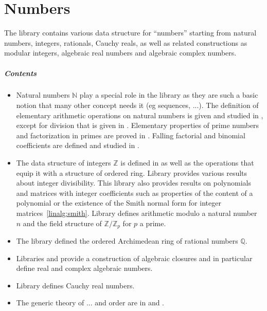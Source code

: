 \chapter{Numbers}

The library contains various data structure for ``numbers''
starting from natural numbers, integers, rationals, Cauchy reals, as well as
related constructions as modular integers, algebraic real numbers and algebraic
complex numbers.

\paragraph{Contents}
\begin{itemize}

\item
Natural numbers $\mathbb{N}$ play a special role in the \mcbMC{} library as they
are such a basic notion that many other concept needs it (eg sequences, ...).
The definition of elementary arithmetic operations on natural numbers
is given and studied in , except for division
that is given in .  Elementary properties of
prime numbers and factorization in primes are proved in
.  Falling factorial and binomial coefficients are defined
and studied in .

\item
The data structure of integers $\mathbb{Z}$ is defined in 
as well as the operations that equip it with a structure of
ordered ring. Library  provides various
results about integer divisibility.  This library also provides
results on polynomials and matrices with integer coefficients
such as properties of the content of a polynomial or the
existence of the Smith normal form for integer matrices~\ref{linalg:smith}.
Library  defines arithmetic modulo a natural number $n$
and the field structure of $\mathbb{Z}/\mathbb{Z}_p$ for $p$ a prime.

\item
The library  defined the ordered Archimedean ring of
rational numbers $\mathbb{Q}$.

\item
Libraries  and 
provide a construction of algebraic closures and in particular define
real and complex algebraic numbers.

\item
Library  defines Cauchy real numbers.

\item
The generic theory of ... and order are in 
and .

\end{itemize}

